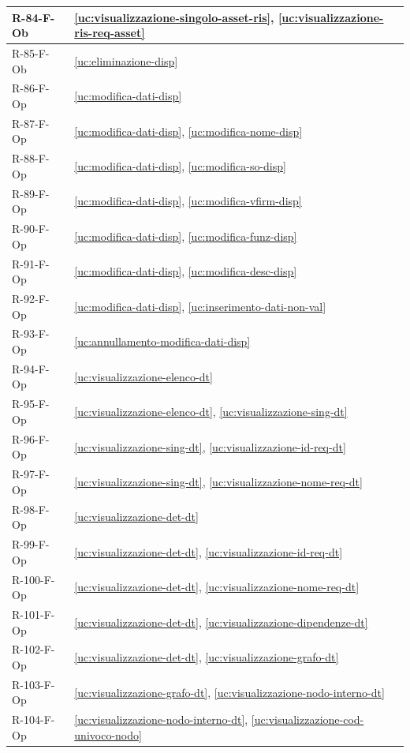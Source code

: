 ﻿\documentclass[a4paper,12pt]{article}
\begin{document}
{\begin{longtable}{|
      >{\centering\arraybackslash}p{}|
      >{\centering\arraybackslash}p{}|
      }
        R-84-F-Ob & \ref{uc:visualizzazione-singolo-asset-ris}, \ref{uc:visualizzazione-ris-req-asset} \\ \hline
        R-85-F-Ob & \ref{uc:eliminazione-disp} \\ \hline
        R-86-F-Op & \ref{uc:modifica-dati-disp} \\ \hline
        R-87-F-Op & \ref{uc:modifica-dati-disp}, \ref{uc:modifica-nome-disp} \\ \hline
        R-88-F-Op & \ref{uc:modifica-dati-disp}, \ref{uc:modifica-so-disp} \\ \hline
        R-89-F-Op & \ref{uc:modifica-dati-disp}, \ref{uc:modifica-vfirm-disp} \\ \hline
        R-90-F-Op & \ref{uc:modifica-dati-disp}, \ref{uc:modifica-funz-disp} \\ \hline
        R-91-F-Op & \ref{uc:modifica-dati-disp}, \ref{uc:modifica-desc-disp} \\ \hline
        R-92-F-Op & \ref{uc:modifica-dati-disp}, \ref{uc:inserimento-dati-non-val} \\ \hline
        R-93-F-Op & \ref{uc:annullamento-modifica-dati-disp} \\ \hline
        R-94-F-Op & \ref{uc:visualizzazione-elenco-dt} \\ \hline
        R-95-F-Op & \ref{uc:visualizzazione-elenco-dt}, \ref{uc:visualizzazione-sing-dt} \\ \hline
        R-96-F-Op & \ref{uc:visualizzazione-sing-dt}, \ref{uc:visualizzazione-id-req-dt} \\ \hline
        R-97-F-Op & \ref{uc:visualizzazione-sing-dt}, \ref{uc:visualizzazione-nome-req-dt} \\ \hline
        R-98-F-Op & \ref{uc:visualizzazione-det-dt} \\ \hline
        R-99-F-Op & \ref{uc:visualizzazione-det-dt}, \ref{uc:visualizzazione-id-req-dt} \\ \hline
        R-100-F-Op & \ref{uc:visualizzazione-det-dt}, \ref{uc:visualizzazione-nome-req-dt} \\ \hline
        R-101-F-Op & \ref{uc:visualizzazione-det-dt}, \ref{uc:visualizzazione-dipendenze-dt} \\ \hline
        R-102-F-Op & \ref{uc:visualizzazione-det-dt}, \ref{uc:visualizzazione-grafo-dt} \\ \hline
        R-103-F-Op & \ref{uc:visualizzazione-grafo-dt}, \ref{uc:visualizzazione-nodo-interno-dt} \\ \hline
        R-104-F-Op & \ref{uc:visualizzazione-nodo-interno-dt}, \ref{uc:visualizzazione-cod-univoco-nodo} \\ \hline

\end{longtable}}
\end{document}
